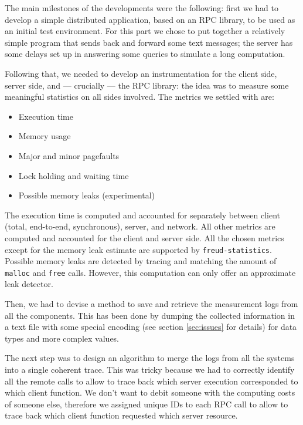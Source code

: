         The main milestones of the developments were the following: first we had to develop a
        simple distributed application, based on an RPC library, to be used as an initial test environment.
        For this part we chose to put together a relatively simple program that sends back and forward
        some text messages; the server has some delays set up in answering some queries to simulate a
        long computation.

        Following that, we needed to develop an instrumentation for the
        client side, server side, and --- crucially --- the RPC library:
        the idea was to measure some meaningful statistics on all
        sides involved.  The metrics we settled with are:

        \begin{itemize}
            \item Execution time
            \item Memory usage
            \item Major and minor pagefaults
            \item Lock holding and waiting time
            \item Possible memory leaks (experimental)
        \end{itemize}

        The execution time is computed and accounted for separately
        between client (total, end-to-end, synchronous), server, and
        network.  All other metrics are computed and accounted for the
        client and server side.  All the chosen metrics except for the
        memory leak estimate are supported by
        \texttt{freud-statistics}.  Possible memory leaks are detected
        by tracing and matching the amount of \texttt{malloc} and
        \texttt{free} calls.  However, this computation can only offer
        an approximate leak detector.

        Then, we had to devise a method to save and retrieve the measurement logs from all the components.
        This has been done by dumping the collected information in a text file with some special encoding
        (see section \ref{sec:issues} for details) for data types and more complex values.

        The next step was to design an algorithm to merge the logs from all the systems into a single
        coherent trace. This was tricky because we had to correctly identify all the remote calls to allow
        to trace back which server execution corresponded to which client function. We don't want to debit
        someone with the computing costs of someone else, therefore we assigned unique IDs to each
        RPC call to allow to trace back which client function requested which server resource.

